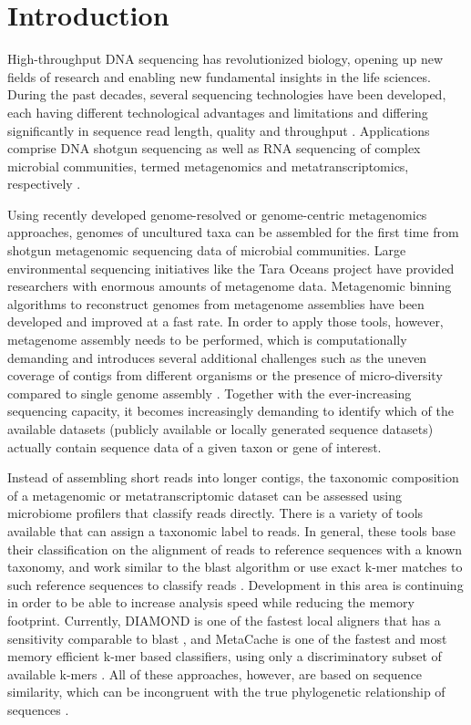 \documentclass{bioinfo}
\begin{document}
\maketitle

\section{Introduction}
High-throughput DNA sequencing has revolutionized biology, opening up new fields of research and enabling new fundamental insights in the life sciences. During the past decades, several sequencing technologies have been developed, each having different technological advantages and limitations and differing significantly in sequence read length, quality and throughput \citep{Mardis2017}. Applications comprise DNA shotgun sequencing as well as RNA sequencing of complex microbial communities, termed metagenomics and metatranscriptomics, respectively \citep{Mitchell2018}. 

Using recently developed genome-resolved or genome-centric metagenomics approaches, genomes of uncultured taxa can be assembled for the first time from shotgun metagenomic sequencing data of microbial communities. Large environmental sequencing initiatives like the Tara Oceans project \citep{Sunagawa2015} have provided researchers with enormous amounts of metagenome data. Metagenomic binning algorithms to reconstruct genomes from metagenome assemblies have been developed and improved at a fast rate. In order to apply those tools, however, metagenome assembly needs to be performed, which is computationally demanding and introduces several additional challenges such as the uneven coverage of contigs from different organisms or the presence of micro-diversity compared to single genome assembly \citep{Quince2017}. Together with the ever-increasing sequencing capacity, it becomes increasingly demanding to identify which of the available datasets (publicly available or locally generated sequence datasets) actually contain sequence data of a given taxon or gene of interest.

Instead of assembling short reads into longer contigs, the taxonomic composition of a metagenomic or metatranscriptomic dataset can be assessed using microbiome profilers that classify reads directly. There is a variety of tools available that can assign a taxonomic label to reads. In general, these tools base their classification on the alignment of reads to reference sequences with a known taxonomy, and work similar to the blast algorithm \citep[e.g. ][]{Huson2016,Truong2015} or use exact k-mer matches to such reference sequences to classify reads \citep[e.g. ][]{Ounit2015,Wood2014}. Development in this area is continuing in order to be able to increase analysis speed while reducing the memory footprint. Currently, DIAMOND is one of the fastest local aligners that has a sensitivity comparable to blast \citep{Buchfink2014}, and MetaCache is one of the fastest and most memory efficient k-mer based classifiers, using only a discriminatory subset of available k-mers \citep{Muller2017}. All of these approaches, however, are based on sequence similarity, which can be incongruent with the true phylogenetic relationship of sequences \citep{Smith2017}.
\end{document}
